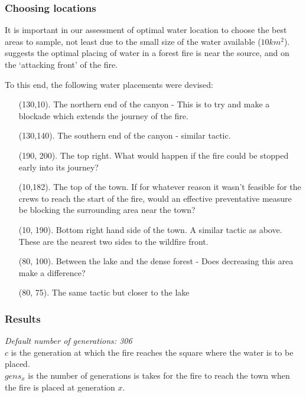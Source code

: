 \documentclass[11pt, a4paper, titlepage]{article}
\begin{document}
  \subsubsection{Choosing locations}
  It is important in our assessment of optimal water location to choose the best areas to sample, not least due to the small size of the water available ($10km^2$). \cite{christopher_2019} suggests the optimal placing of water in a forest fire is near the source, and on the `attacking front' of the fire.

  To this end, the following water placements were devised:

  \begin{itemize}
    \item[(130,10).] The northern end of the canyon - This is to try and make a blockade which extends the journey of the fire.
    \item[(130,140).] The southern end of the canyon - similar tactic.
    \item[(190, 200).]  The top right. What would happen if the fire could be stopped early into its journey?
    \item[ (10,182).] The top of the town. If for whatever reason it wasn't feasible for the crews to reach the start of the fire, would an effective preventative measure be blocking the surrounding area near the town?
    \item[ (10, 190).] Bottom right hand side of the town. A similar tactic as above. These are the nearest two sides to the wildfire front.
    \item[ (80, 100).] Between the lake and the dense forest - Does decreasing this area make a difference?
    \item[ (80, 75).] The same tactic but closer to the lake    
  \end{itemize}

  \subsubsection{Results}


    \textit{Default number of generations: 306} \\
    $c$ is the generation at which the fire reaches the square where the water is to be placed. \\
    $gens_{x}$ is the number of generations is takes for the fire to reach the town when the fire is placed at generation $x$.
\end{document}
